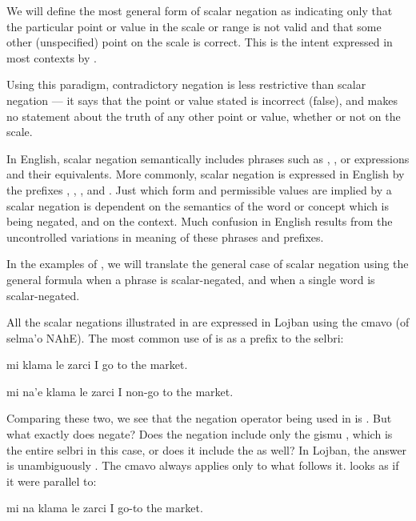 We will define the most general form of scalar negation as
    indicating only that the particular point or value in the scale
    or range is not valid and that some other (unspecified) point
    on the scale is correct. This is the intent expressed in most
    contexts by .

Using this paradigm, contradictory negation is less
    restrictive than scalar negation --- it says that the point or
    value stated is incorrect (false), and makes no statement about
    the truth of any other point or value, whether or not on the
    scale.

In English, scalar negation semantically includes phrases
    such as , , or 
    expressions and their equivalents. More commonly, scalar
    negation is expressed in English by the prefixes ,
    , , and . Just which form and permissible
    values are implied by a scalar negation is dependent on the
    semantics of the word or concept which is being negated, and on
    the context. Much confusion in English results from the
    uncontrolled variations in meaning of these phrases and
    prefixes.

In the examples of , we will
    translate the general case of scalar negation using the general
    formula  when a phrase is scalar-negated, and
     when a single word is scalar-negated.



All the scalar negations illustrated in  are expressed in Lojban using the
    cmavo  (of selma'o NAhE). The most common use of
     is as a prefix to the selbri:
\begin{example}
mi klama le zarci\n
I go to the market.
\end{example}

\begin{example}
mi na'e klama le zarci\n
I non-go to the market.
\end{example}

Comparing these two, we see that the negation operator being
    used in  is . But what
    exactly does  negate? Does the negation include only
    the gismu , which is the entire selbri in this case,
    or does it include the  as well? In Lojban, the
    answer is unambiguously . The cmavo 
    always applies only to what follows it.
 looks as if it were parallel
    to:
\begin{example}
mi na klama le zarci\n
I  go-to the market.
\end{example}

